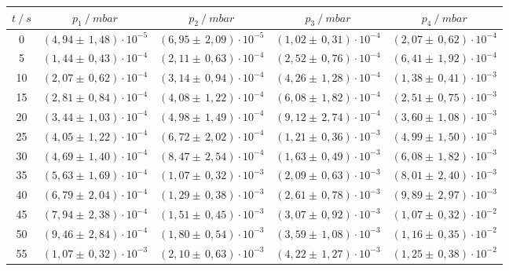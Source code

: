 \begin{table}[H]
  \centering
  \begin{tabular}{c|c|c|c|c}
    {$t \:/\: \si{s}$} & {$p_1 \:/\: \si{mbar} $} & {$p_2 \:/\: \si{mbar} $} & {$p_3 \:/\: \si{mbar} $} & {$p_4 \:/\: \si{mbar}$}\\
  \midrule
  0 & $(4,94 \pm \, 1,48)\cdot 10^{-5}$ & $(6,95 \pm \, 2,09)\cdot 10^{-5}$ & $(1,02 \pm \, 0,31)\cdot 10^{-4}$ & $(2,07 \pm \, 0,62)\cdot 10^{-4}$\\
  5 & $(1,44 \pm \, 0,43)\cdot 10^{-4}$ & $(2,11 \pm \, 0,63)\cdot 10^{-4}$ & $(2,52 \pm \, 0,76)\cdot 10^{-4}$ & $(6,41 \pm \, 1,92)\cdot 10^{-4}$\\
  10 & $(2,07 \pm \, 0,62)\cdot 10^{-4}$ & $(3,14 \pm \, 0,94)\cdot 10^{-4}$ & $(4,26 \pm \, 1,28)\cdot 10^{-4}$ & $(1,38 \pm \, 0,41)\cdot 10^{-3}$\\
  15 & $(2,81 \pm \, 0,84)\cdot 10^{-4}$ & $(4,08 \pm \, 1,22)\cdot 10^{-4}$ & $(6,08 \pm \, 1,82)\cdot 10^{-4}$ & $(2,51 \pm \, 0,75)\cdot 10^{-3}$\\
  20 & $(3,44 \pm \, 1,03)\cdot 10^{-4}$ & $(4,98 \pm \, 1,49)\cdot 10^{-4}$ & $(9,12 \pm \, 2,74)\cdot 10^{-4}$ & $(3,60 \pm \, 1,08)\cdot 10^{-3}$\\
  25 & $(4,05 \pm \, 1,22)\cdot 10^{-4}$ & $(6,72 \pm \, 2,02)\cdot 10^{-4}$ & $(1,21 \pm \, 0,36)\cdot 10^{-3}$ & $(4,99 \pm \, 1,50)\cdot 10^{-3}$\\
  30 & $(4,69 \pm \, 1,40)\cdot 10^{-4}$ & $(8,47 \pm \, 2,54)\cdot 10^{-4}$ & $(1,63 \pm \, 0,49)\cdot 10^{-3}$ & $(6,08 \pm \, 1,82)\cdot 10^{-3}$\\
  35 & $(5,63 \pm \, 1,69)\cdot 10^{-4}$ & $(1,07 \pm \, 0,32)\cdot 10^{-3}$ & $(2,09 \pm \, 0,63)\cdot 10^{-3}$ & $(8,01 \pm \, 2,40)\cdot 10^{-3}$\\
  40 & $(6,79 \pm \, 2,04)\cdot 10^{-4}$ & $(1,29 \pm \, 0,38)\cdot 10^{-3}$ & $(2,61 \pm \, 0,78)\cdot 10^{-3}$ & $(9,89 \pm \, 2,97)\cdot 10^{-3}$\\
  45 & $(7,94 \pm \, 2,38)\cdot 10^{-4}$ & $(1,51 \pm \, 0,45)\cdot 10^{-3}$ & $(3,07 \pm \, 0,92)\cdot 10^{-3}$ & $(1,07 \pm \, 0,32)\cdot 10^{-2}$\\
  50 & $(9,46 \pm \, 2,84)\cdot 10^{-4}$ & $(1,80 \pm \, 0,54)\cdot 10^{-3}$ & $(3,59 \pm \, 1,08)\cdot 10^{-3}$ & $(1,16 \pm \, 0,35)\cdot 10^{-2}$\\
  55 & $(1,07 \pm \, 0,32)\cdot 10^{-3}$ & $(2,10 \pm \, 0,63)\cdot 10^{-3}$ & $(4,22 \pm \, 1,27)\cdot 10^{-3}$ & $(1,25 \pm \, 0,38)\cdot 10^{-2}$\\

\end{tabular}
\end{table}
